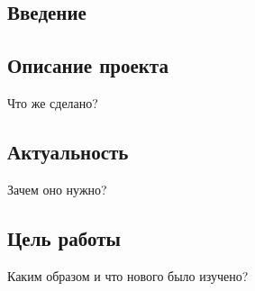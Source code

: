 
	\newpage
	
	\begin{center}	
		\section{Введение}
		
		\end{center}
\subsection{Описание проекта}
Что же сделано?
\subsection{Актуальность}
Зачем оно нужно?
\subsection{Цель работы}
Каким образом и что нового было изучено?